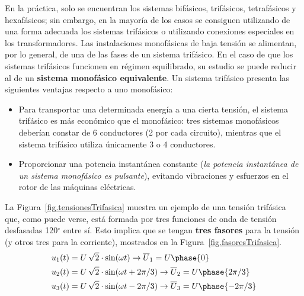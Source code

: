 \documentclass[11pt]{book} %
\numberwithin{dummy}{section}
\theoremstyle{ocrenumbox}
\theoremstyle{blacknumex}
\theoremstyle{blacknumbox}
\theoremstyle{ocrenum}
\newlength\esp
\begin{document}
	En la práctica, solo se encuentran los sistemas bifásicos, trifásicos, tetrafásicos y hexafásicos; sin embargo, en la mayoría de los casos se consiguen utilizando de una forma adecuada los sistemas trifásicos o utilizando conexiones especiales en los transformadores. Las instalaciones monofásicas de baja tensión se alimentan, por lo general, de una de las fases de un sistema trifásico. En el caso de que los sistemas trifásicos funcionen en régimen equilibrado, su estudio se puede reducir al de un \textbf{sistema monofásico equivalente}. Un sistema trifásico presenta las siguientes ventajas respecto a uno monofásico:
	\begin{itemize}
		\item Para transportar una determinada energía a una cierta tensión, el sistema trifásico es más económico que el monofásico: tres sistemas monofásicos deberían constar de 6 conductores (2 por cada circuito), mientras que el sistema trifásico utiliza únicamente 3 o 4 conductores.
		\item Proporcionar una potencia instantánea constante (\emph{la potencia instantánea de un sistema monofásico es pulsante}), evitando vibraciones y esfuerzos en el rotor de las máquinas eléctricas.
	\end{itemize}
	La Figura~\ref{fig.tensionesTrifasica} muestra un ejemplo de una tensión trifásica que, como puede verse, está formada por tres funciones de onda de tensión desfasadas 120$^\circ$ entre sí. Esto implica que se tengan \textbf{tres fasores} para la tensión (y otros tres para la corriente), mostrados en la Figura~\ref{fig.fasoresTrifasica}. 
	\begin{align*}
		u_1(t) &= U\,\sqrt{2}\cdot \sin(\omega t)\rightarrow  \overline{U}_1 = U\phase{0}\\
		u_2(t) &= U\,\sqrt{2} \cdot\sin(\omega t + 2\pi/3) \rightarrow  \overline{U}_2 = U\phase{2\pi/3}\\
		u_3(t) &= U\,\sqrt{2}\cdot \sin(\omega t - 2\pi/3) \rightarrow  \overline{U}_3 = U\phase{-2\pi/3}
	\end{align*}
\end{document}
